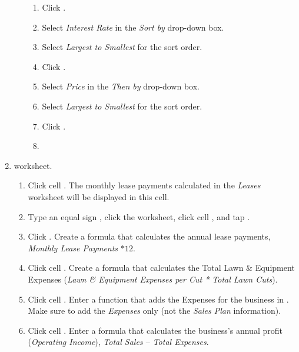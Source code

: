 \begin{enumbox}
\begin{enumerate}
\begin{enumerate}
			\begin{enumerate}
				\item Click . 
				\item Select \textit{Interest Rate} in the \textit{Sort by} drop-down box. 
				\item Select \textit{Largest to Smallest} for the sort order. 
				\item Click . 
				\item Select \textit{Price} in the \textit{Then by} drop-down box. \item Select \textit{Largest to Smallest} for the sort order. 
				\item Click .
				\item 
			\end{enumerate}	
	
		\end{enumerate}
	
		\item {} worksheet.
		
		\begin{enumerate}
			\item Click cell . The monthly lease payments calculated in the \textit{Leases} worksheet will be displayed in this cell.
			
			\item Type an equal sign \fmtTyping{=}, click the  worksheet, click cell , and tap .
			
			\item Click . Create a formula that calculates the annual lease payments, \textit{Monthly Lease Payments $ * 12 $}.
			
			\item Click cell . Create a formula that calculates the Total Lawn \& Equipment Expenses (\textit{Lawn \& Equipment Expenses per Cut * Total Lawn Cuts}).
			
			\item Click cell . Enter a  function that adds the Expenses for the business in . Make sure to add the \textit{Expenses} only (not the \textit{Sales Plan} information).
			
			\item Click cell . Enter a formula that calculates the business's annual profit (\textit{Operating Income}), \textit{Total Sales $ – $ Total Expenses}.
			

\end{enumerate}
\end{enumerate}
\end{enumbox}
